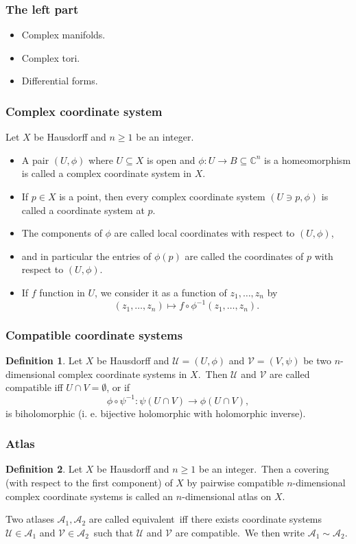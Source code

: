 \documentclass[usenames,dvipsnames]{beamer}
\theoremstyle{definition}
\newtheorem{defi}{Definition}
\begin{document}
\begin{frame}
  \frametitle{The left part}
  \begin{itemize}
    \item Complex manifolds.\pause
    \item Complex tori.\pause
    \item Differential forms.
  \end{itemize}
\end{frame}

\begin{frame}
  \frametitle{Complex coordinate system}
    Let $X$ be Hausdorff and $n\geq 1$ be an integer.\pause
    \begin{itemize}
      \item A pair $(U,\phi)$ where $U\subseteq X$ is open and $\phi:U\to B\subseteq\mathbb{C}^n$ is a homeomorphism is called a complex coordinate system in $X$.\pause
      \item If $p\in X$ is a point, then every complex coordinate system $(U\ni p,\phi)$ is called a coordinate system at $p$.\pause
      \item The components of $\phi$ are called local coordinates with respect to $(U,\phi)$,\pause
      \item and in particular the entries of $\phi(p)$ are called the coordinates of $p$ with respect to $(U,\phi)$.\pause
      \item If $f$ function in $U$, we consider it as a function of $z_1,\dots,z_n$ by
        \[(z_1,\dots,z_n)\mapsto f\circ\phi^{-1}(z_1,\dots,z_n).\]
    \end{itemize}
\end{frame}

\begin{frame}
  \frametitle{Compatible coordinate systems}
  \begin{defi}
    Let $X$ be Hausdorff and $\mathcal{U}=(U,\phi)$ and $\mathcal{V}=(V,\psi)$ be two $n$-dimensional complex coordinate systems in $X$.\pause~Then $\mathcal{U}$ and $\mathcal{V}$ are called compatible iff $U\cap V=\emptyset$, or if\pause
    \[\phi\circ\psi^{-1}:\psi(U\cap V)\to \phi(U\cap V),\]\pause
    is biholomorphic (i. e. bijective holomorphic with holomorphic inverse).
  \end{defi}
\end{frame}

\begin{frame}
  \frametitle{Atlas}
  \begin{defi}
    Let $X$ be Hausdorff and $n\geq 1$ be an integer.\pause~Then a covering (with respect to the first component) of $X$ by pairwise compatible $n$-dimensional complex coordinate systems is called an $n$-dimensional atlas on $X$.\pause

    Two atlases $\mathcal{A}_1,\mathcal{A}_2$ are called equivalent\pause~iff there exists coordinate systems $\mathcal{U}\in\mathcal{A}_1$ and $\mathcal{V}\in\mathcal{A}_2$\pause~such that $\mathcal{U}$ and $\mathcal{V}$ are compatible.\pause~We then write $\mathcal{A}_1\sim\mathcal{A}_2$.
  \end{defi}
\end{frame}
\end{document}
